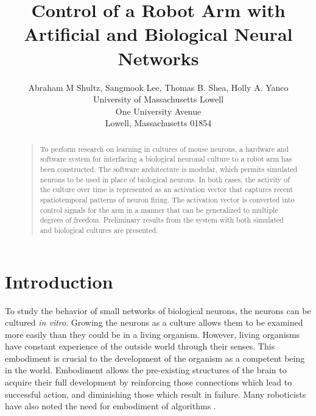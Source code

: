 \documentclass[letterpaper]{article}
\begin{document}
%
\title{Control of a Robot Arm with Artificial and Biological Neural Networks}
\author{Abraham M Shultz, Sangmook Lee, Thomas B. Shea, Holly A. Yanco\\
University of Massachusetts Lowell\\
One University Avenue\\
Lowell, Massachusetts 01854\\
}
\maketitle
\begin{abstract}
\begin{quote}
To perform research on learning in cultures of mouse neurons, a hardware and software system for interfacing a biological neuronal culture to a robot arm has been constructed. 
The software architecture is modular, which permits simulated neurons to be used in place of biological neurons. 
In both cases, the activity of the culture over time is represented as an activation vector that captures recent spatiotemporal patterns of neuron firing. 
The activation vector is converted into control signals for the arm in a manner that can be generalized to multiple degrees of freedom. 
Preliminary results from the system with both simulated and biological cultures are presented. 
\end{quote}
\end{abstract}

\section{Introduction}

To study the behavior of small networks of biological neurons, the neurons can be cultured \textit{in vitro}. 
Growing the neurons as a culture allows them to be examined more easily than they could be in a living organism. 
However, living organisms have constant experience of the outside world through their senses. 
This embodiment is crucial to the development of the organism as a competent being in the world.
Embodiment allows the pre-existing structures of the brain to acquire their full development by reinforcing those connections which lead to successful action, and diminishing those which result in failure. 
Many roboticists have also noted the need for embodiment of algorithms \cite{brooks1991intelligence,chiel1997brain,anderson2003embodied}. 
\end{document}
